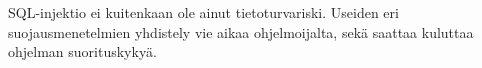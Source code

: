 \documentclass[finnish]{tktltiki2}
\theoremstyle{definition}
\theoremstyle{remark}
\begin{document}
	SQL-injektio ei kuitenkaan ole ainut tietoturvariski. Useiden eri suojausmenetelmien yhdistely vie aikaa ohjelmoijalta, sekä saattaa kuluttaa ohjelman suorituskykyä. 
	
	
	
	
	
	
	
	
	
	
	
	
\end{document}

